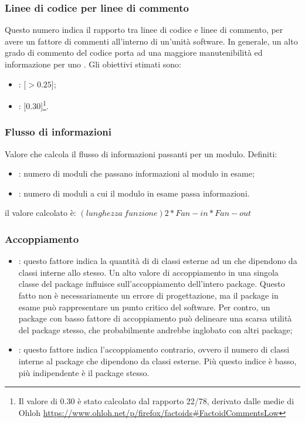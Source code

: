 \subsubsection{Linee di codice per linee di commento}
\label{4.2.5}
Questo numero indica il rapporto tra linee di codice e linee di commento, per avere un fattore di commenti all'interno di un'unità software. In generale, un alto grado di commento del codice porta ad una maggiore manutenibilità ed informazione per uno .
Gli obiettivi stimati sono:
\begin{itemize}
\item {}: [$>0.25$];
\item {}: [0.30]\footnote{Il valore di 0.30 è stato calcolato dal rapporto 22/78, derivato dalle medie di Ohloh \url{https://www.ohloh.net/p/firefox/factoids\#FactoidCommentsLow}}.
\end{itemize}

\subsubsection{Flusso di informazioni}
\label{4.2.6}
Valore che calcola il flusso di informazioni passanti per un modulo.
Definiti:
\begin{itemize}
\item {}: numero di moduli che passano informazioni al modulo in esame;
\item {}: numero di moduli a cui il modulo in esame passa informazioni.
\end{itemize}
il valore calcolato è:
\begin{math}(lunghezza\:funzione)2 * Fan-in * Fan-out\end{math}

\subsubsection{Accoppiamento}
\label{4.2.7}
\begin{itemize}
\item {}: questo fattore indica la quantità di di classi esterne ad un  che dipendono da classi interne allo stesso.
Un alto valore di accoppiamento in una singola classe del package influisce sull'accoppiamento dell'intero package. Questo fatto non è necessariamente un errore di progettazione, ma il package in esame può rappresentare un punto critico del software. Per contro, un package con basso fattore di accoppiamento può delineare una scarsa utilità del package stesso, che probabilmente andrebbe inglobato con altri package;
\item {}: questo fattore indica l'accoppiamento contrario, ovvero il numero di classi interne al package che dipendono da classi esterne. Più questo indice è basso, più indipendente è il package stesso.
\end{itemize}

